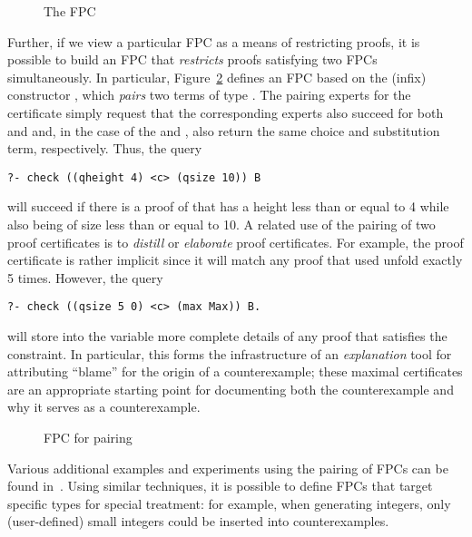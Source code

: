 \documentclass[a4paper,USenglish,cleveref, autoref, thm-restate]{lipics-v2019}
\begin{document}
\begin{figure}


\caption{The  FPC}
\label{fig:max}
\end{figure}

Further, if we view a particular FPC as a means of restricting proofs, it is
possible to build an FPC that \emph{restricts} proofs satisfying two FPCs
simultaneously.
%
In particular, Figure~\ref{fig:pairing} defines an FPC based on the
(infix) constructor , which \emph{pairs} two terms of type
.
%
The pairing experts for the certificate  simply
request that the corresponding experts also succeed for both
 and  and, in the case of the  and
, also return the same choice and substitution term,
respectively.
%
Thus, the query 
\begin{lstlisting}
?- check ((qheight 4) <c> (qsize 10)) B
\end{lstlisting}
will succeed if there is a proof of  that has a height less
than or equal to 4 while also being of size less than or equal to 10.
%
A related use of the pairing of two proof certificates is to %
\emph{distill} or \emph{elaborate} proof certificates. 
%
For example, the proof certificate  is rather implicit
since it will match any proof that used unfold exactly 5 times.
%
However, the query
\begin{lstlisting}
?- check ((qsize 5 0) <c> (max Max)) B.
\end{lstlisting}
will store into the \lP variable  more complete details of
any proof that satisfies the  constraint.
%
In particular, this forms the infrastructure of 
 an \emph{explanation} tool for attributing ``blame'' for
the origin of a counterexample; these maximal
certificates are an appropriate starting point for documenting
both the counterexample and why it serves as a counterexample.


\begin{figure}


\caption{FPC for pairing}
\label{fig:pairing}
\end{figure}

Various  additional examples and experiments using the pairing of FPCs
can be found in~\cite{Pair}. Using similar techniques, it is possible to define FPCs that target
specific types for special treatment: for example, when generating
integers, only (user-defined) small integers could be inserted into
counterexamples.
\end{document}
